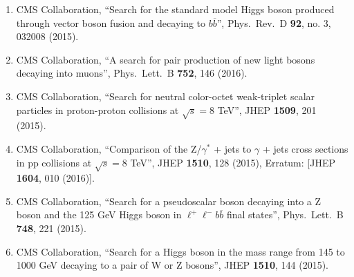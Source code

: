 \begin{enumerate}
\item CMS Collaboration, ``Search for the standard model Higgs boson produced through vector boson fusion and decaying to $b \overline{b}$'', Phys.\ Rev.\ D {\bf 92}, no. 3, 032008 (2015).

\item CMS Collaboration, ``A search for pair production of new light bosons decaying into muons'', Phys.\ Lett.\ B {\bf 752}, 146 (2016).

\item CMS Collaboration, ``Search for neutral color-octet weak-triplet scalar particles in proton-proton collisions at $ \sqrt{s}=8 $ TeV'', JHEP {\bf 1509}, 201 (2015).

\item CMS Collaboration, ``Comparison of the Z/$\gamma$$^{*}$ + jets to $\gamma$ + jets cross sections in pp collisions at $ \sqrt{s}=8 $ TeV'', JHEP {\bf 1510}, 128 (2015), Erratum: [JHEP {\bf 1604}, 010 (2016)].

\item CMS Collaboration, ``Search for a pseudoscalar boson decaying into a Z boson and the 125 GeV Higgs boson in $\ell^+\ell^-b\overline{b}$ final states'', Phys.\ Lett.\ B {\bf 748}, 221 (2015).

\item CMS Collaboration, ``Search for a Higgs boson in the mass range from 145 to 1000 GeV decaying to a pair of W or Z bosons'', JHEP {\bf 1510}, 144 (2015).


\end{enumerate}

